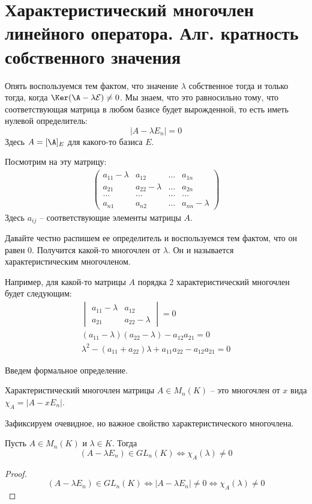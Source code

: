 \section{Характеристический многочлен линейного оператора. Алг. кратность собственного значения}
Опять воспользуемся тем фактом, что значение $\lambda$ собственное тогда и только тогда, когда $\Ker(\A - \lambda\mathcal{E}) \neq 0$.
Мы знаем, что это равносильно тому, что соответствующая матрица в любом базисе будет вырожденной, то есть иметь нулевой определитель: \[ |A - \lambda E_n| = 0 \]
Здесь $A = [\A]_E$ для какого-то базиса $E$.

Посмотрим на эту матрицу:
\begin{gather*}
    \begin{pmatrix}
        a_{11} - \lambda & a_{12} & \dots & a_{1n} \\
        a_{21} & a_{22} - \lambda  & \dots & a_{2n} \\
        \dots & \dots & \dots & \dots \\
        a_{n1} & a_{n2} & \dots & a_{nn} - \lambda 
    \end{pmatrix}
\end{gather*}
Здесь $a_{ij}$ -- соответствующие элементы матрицы $A$.

Давайте честно распишем ее определитель и воспользуемся тем фактом, что он равен 0.
Получится какой-то многочлен от $\lambda$.
Он и называется характеристическим многочленом.

Например, для какой-то матрицы $A$ порядка 2 характеристический многочлен будет следующим:
\begin{gather*}
    \begin{vmatrix}
        a_{11} - \lambda & a_{12} \\
        a_{21} & a_{22} - \lambda
    \end{vmatrix} = 0 \\
    (a_{11} - \lambda)(a_{22} - \lambda) - a_{12}a_{21} = 0 \\
    \lambda^2 - (a_{11} + a_{22})\lambda + a_{11}a_{22} - a_{12}a_{21} = 0
\end{gather*}

Введем формальное определение.
\begin{conj}
    Характеристический многочлен матрицы $A \in M_n(K)$ -- это многочлен от $x$ вида $\chi_A = |A - xE_n|$.
\end{conj}

Зафиксируем очевидное, но важное свойство характеристического многочлена.
\begin{lemma}
    Пусть $A \in M_n(K)$ и $\lambda \in K$. Тогда \[ (A - \lambda E_n) \in GL_n(K) \Leftrightarrow \chi_A(\lambda) \neq 0 \]
\end{lemma}
\begin{proof}
    \[ (A - \lambda E_n) \in GL_n(K) \Leftrightarrow |A - \lambda E_n| \neq 0 \Leftrightarrow \chi_A(\lambda) \neq 0 \]
\end{proof}

